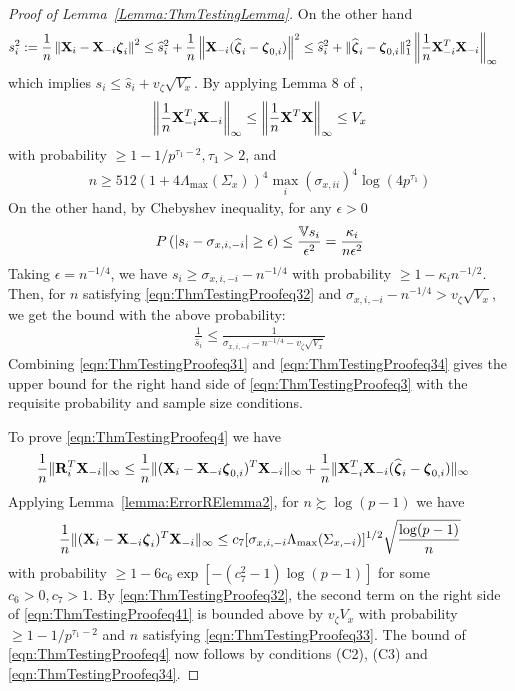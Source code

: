 \begin{proof}[Proof of Lemma~\ref{Lemma:ThmTestingLemma}]
On the other hand
%
\begin{align*}
s_i^2 := \frac{1}{n} \left\| {\mathbf{X}}_i - {\mathbf{X}}_{-i}  {\boldsymbol{\zeta}}_i \right\|^2 & \leq 
\widehat s_i^2 + \frac{1}{n} \left\| {\mathbf{X}}_{-i} (\widehat {{\boldsymbol{\zeta}}}_i - {\boldsymbol{\zeta}}_{0,i} ) \right\|^2
\leq \widehat s_i^2 + \| \widehat {{\boldsymbol{\zeta}}}_i - {\boldsymbol{\zeta}}_{0,i} \|_1^2 \left\| \frac{1}{n} {\mathbf{X}}_{-i}^T {\mathbf{X}}_{-i} \right\|_\infty
\end{align*}
%
which implies $s_i \leq \widehat s_i + v_\zeta \sqrt{ V_x}$. By applying Lemma 8 of \cite{RavikumarEtal11},
%
\begin{align}\label{eqn:ThmTestingProofeq32}
\left\| \frac{1}{n} {\mathbf{X}}_{-i}^T {\mathbf{X}}_{-i} \right\|_\infty \leq
\left\| \frac{1}{n} {\mathbf{X}}^T {\mathbf{X}} \right\|_\infty \leq V_x
\end{align}
%
with probability $ \geq 1 - 1/p^{\tau_1-2}, \tau_1>2$, and
%
\begin{align}\label{eqn:ThmTestingProofeq33}
n \geq 512 ( 1 + 4 \Lambda_{\max} (\Sigma_{x}))^4 \max_i (\sigma_{x,ii} )^4 \log (4p^{\tau_1})
\end{align}
%
On the other hand, by Chebyshev inequality, for any $\epsilon>0$
%
$$
P\left( | s_i - \sigma_{x,i,-i}| \geq \epsilon \right) \leq \frac{{\mathbb{V}} s_i}{\epsilon^2} =
\frac{\kappa_i}{n \epsilon^2}
$$
%
Taking $\epsilon = n^{-1/4}$, we have $s_i \geq \sigma_{x,i,-i} - n^{-1/4}$ with probability $\geq 1 - \kappa_i n^{-1/2}$. Then, for $n$ satisfying \eqref{eqn:ThmTestingProofeq32} and $\sigma_{x,i,-i} - n^{-1/4} >  v_\zeta \sqrt{ V_x}$, we get the bound with the above probability:
%
\begin{align}\label{eqn:ThmTestingProofeq34}
\frac{1}{\widehat s_i} \leq \frac{1}{\sigma_{x,i,-i} - n^{-1/4} - v_\zeta \sqrt{ V_x}}
\end{align}
%
Combining \eqref{eqn:ThmTestingProofeq31} and \eqref{eqn:ThmTestingProofeq34} gives the upper bound for the right hand side of \eqref{eqn:ThmTestingProofeq3} with the requisite probability and sample size conditions.

To prove \eqref{eqn:ThmTestingProofeq4} we have
%
\begin{align}\label{eqn:ThmTestingProofeq41}
\frac{1}{n} \| {\mathbf{R}}_i^T {\mathbf{X}}_{-i} \|_\infty & \leq
\frac{1}{n} \| ({\mathbf{X}}_i - {\mathbf{X}}_{-i} {\boldsymbol{\zeta}}_{0,i})^T {\mathbf{X}}_{-i} \|_\infty +
\frac{1}{n} \| {\mathbf{X}}_{-i}^T {\mathbf{X}}_{-i} ( \widehat {{\boldsymbol{\zeta}}}_i - {\boldsymbol{\zeta}}_{0,i}) \|_\infty
\end{align}
%
Applying Lemma~\ref{lemma:ErrorRElemma2}, for $n \succsim \log(p-1)$ we have
%
%
\begin{align}
\frac{1}{n} \| ({\mathbf{X}}_i -  {\mathbf{X}}_{-i} {\boldsymbol{\zeta}}_i )^T {\mathbf{X}}_{-i} \|_\infty \leq 
c_{7} [ \sigma_{x,i,-i} \Lambda_{\max} (\Sigma_{x, -i}) ]^{1/2} \sqrt{\frac{ \log (p-1)}{n}}
\end{align}
%
with probability $\geq 1 - 6c_{6} \exp [-(c_{7}^2-1) \log (p-1)]$ for some $c_{6} >0, c_{7} > 1$. By \eqref{eqn:ThmTestingProofeq32}, the second term on the right side of \eqref{eqn:ThmTestingProofeq41} is bounded above by $v_\zeta V_x$ with probability $ \geq 1 - 1/p^{\tau_1-2}$ and $n$ satisfying \eqref{eqn:ThmTestingProofeq33}. The bound of \eqref{eqn:ThmTestingProofeq4} now follows by conditions (C2), (C3) and \eqref{eqn:ThmTestingProofeq34}.
\end{proof}